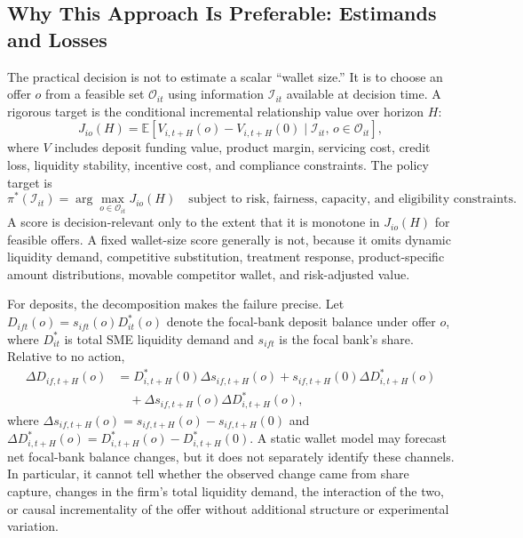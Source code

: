 \documentclass[11pt]{article}
\begin{document}
\subsection{Why This Approach Is Preferable: Estimands and Losses}

The practical decision is not to estimate a scalar ``wallet size.'' It is to
choose an offer $o$ from a feasible set $\mathcal{O}_{it}$ using information
$\mathcal{I}_{it}$ available at decision time. A rigorous target is the
conditional incremental relationship value over horizon $H$:
\[
  J_{io}(H)
  =
  \mathbb{E}\!\left[
    V_{i,t+H}(o)-V_{i,t+H}(0)
    \mid \mathcal{I}_{it},\, o\in\mathcal{O}_{it}
  \right],
\]
where $V$ includes deposit funding value, product margin, servicing cost,
credit loss, liquidity stability, incentive cost, and compliance constraints.
The policy target is
\[
  \pi^{*}(\mathcal{I}_{it})
  =
  \arg\max_{o\in\mathcal{O}_{it}}
  J_{io}(H)
  \quad
  \text{subject to risk, fairness, capacity, and eligibility constraints.}
\]
A score is decision-relevant only to the extent that it is monotone in
$J_{io}(H)$ for feasible offers. A fixed wallet-size score generally is not,
because it omits dynamic liquidity demand, competitive substitution, treatment
response, product-specific amount distributions, movable competitor wallet, and
risk-adjusted value.

For deposits, the decomposition makes the failure precise. Let
$D_{ift}(o)=s_{ift}(o)D_{it}^{*}(o)$ denote the focal-bank deposit balance under
offer $o$, where $D_{it}^{*}$ is total SME liquidity demand and $s_{ift}$ is the
focal bank's share. Relative to no action,
\[
\begin{aligned}
  \Delta D_{if,t+H}(o)
  &=
  D_{i,t+H}^{*}(0)\Delta s_{if,t+H}(o)
  + s_{if,t+H}(0)\Delta D_{i,t+H}^{*}(o) \\
  &\quad
  + \Delta s_{if,t+H}(o)\Delta D_{i,t+H}^{*}(o),
\end{aligned}
\]
where $\Delta s_{if,t+H}(o)=s_{if,t+H}(o)-s_{if,t+H}(0)$ and
$\Delta D_{i,t+H}^{*}(o)=D_{i,t+H}^{*}(o)-D_{i,t+H}^{*}(0)$. A static wallet
model may forecast net focal-bank balance changes, but it does not separately
identify these channels. In particular, it cannot tell whether the observed
change came from share capture, changes in the firm's total liquidity demand,
the interaction of the two, or causal incrementality of the offer without
additional structure or experimental variation.
\end{document}
